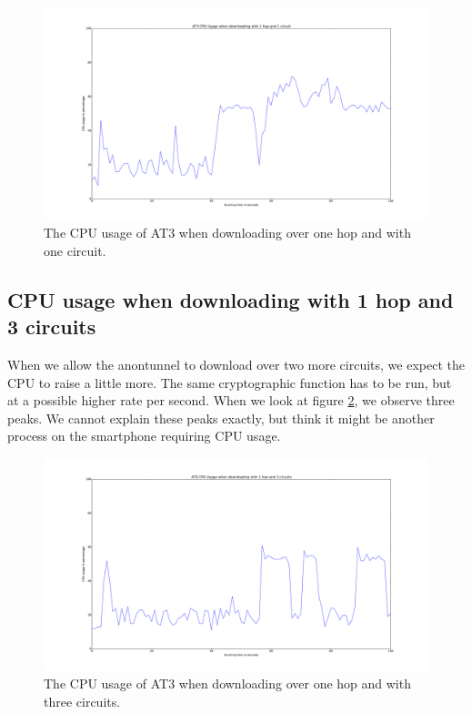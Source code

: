 		\begin{figure}[!h]
			\centering
			\includegraphics[width=\textwidth]{graphics/cpu_usage_1_hop_1_circuit.pdf}
			\caption{The CPU usage of AT3 when downloading over one hop and with one circuit.}
			\label{fig:cpu_1_hop_1_circuit}
		\end{figure}
			
	\clearpage
	\subsection{CPU usage when downloading with 1 hop and 3 circuits}
		When we allow the anontunnel to download over two more circuits, we expect the CPU to raise a little more. The same cryptographic function has to be run, but at a possible higher rate per second. When we look at figure \ref{fig:cpu_1_hop_3_circuits}, we observe three peaks. We cannot explain these peaks exactly, but think it might be another process on the smartphone requiring CPU usage.
		
		\begin{figure}[!h]
			\centering
			\includegraphics[width=\textwidth]{graphics/cpu_usage_1_hop_3_circuits.pdf}
			\caption{The CPU usage of AT3 when downloading over one hop and with three circuits.}
			\label{fig:cpu_1_hop_3_circuits}
		\end{figure}
		

